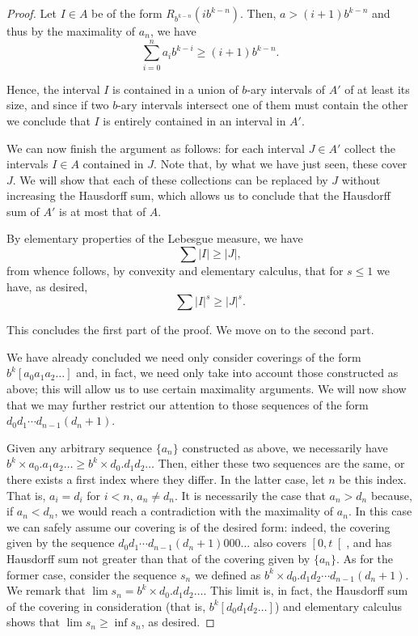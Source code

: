 \documentclass[11pt, reqno]{amsart}
\begin{document}
\begin{proof}
Let $I \in A$ be of the form $R_{b^{k-n}}(i b^{k-n})$. Then, $a > (i+1) b^{k-n}$ and thus by the maximality of $a_n$, we have
\[ \sum_{i = 0}^n a_i b^{k-i} \geq (i+1) b^{k-n}. \]

Hence, the interval $I$ is contained in a union of $b$-ary intervals of $A'$ of at least its size, and since if two $b$-ary intervals intersect one of them must contain the other we conclude that $I$ is entirely contained in an interval in $A'$.

We can now finish the argument as follows: for each interval $J \in A'$ collect the intervals $I \in A$ contained in $J$. Note that, by what we have just seen, these cover $J$. We will show that each of these collections can be replaced by $J$ without increasing the Hausdorff sum, which allows us to conclude that the Hausdorff sum of $A'$ is at most that of $A$.

By elementary properties of the Lebesgue measure, we have
\[ \sum \lvert I \rvert \geq \lvert J \rvert,\]
from whence follows, by convexity and elementary calculus, that for $s \leq 1$ we have, as desired,
\[ \sum \lvert I \rvert^s \geq \lvert J \rvert^s.\]

This concludes the first part of the proof. We move on to the second part.

We have already concluded we need only consider coverings of the form $b^k [a_0 a_1 a_2 \dots]$ and, in fact, we need only take into account those constructed as above; this will allow us to use certain maximality arguments. We will now show that we may further restrict our attention to those sequences of the form $d_0 d_1 \cdots d_{n-1} (d_n + 1)$.

Given any arbitrary sequence $\{a_n\}$ constructed as above, we necessarily have $b^k \times a_0 . a_1 a_2 \ldots \geq b^k \times d_0 . d_1 d_2 \dots$ Then, either these two sequences are the same, or there exists a first index  where they differ. In the latter case, let $n$ be this index. That is, $a_i = d_i$ for $i < n$, $a_n \neq d_n$. It is necessarily the case that $a_n > d_n$ because, if $a_n < d_n$, we would reach a contradiction with the maximality of $a_n$. In this case we can safely assume our covering is of the desired form: indeed, the covering given by the sequence $d_0 d_1 \cdots d_{n-1} (d_n + 1) 0 0 0 \dots$ also covers $\left[0, t \right[$, and has Hausdorff sum not greater than that of the covering given by $\{a_n\}$.
As for the former case, consider the sequence $s_n$ we defined as $b^k \times d_0 . d_1 d_2 \cdots d_{n-1} (d_n + 1)$. We remark that $\lim s_n = b^k \times d_0 . d_1 d_2 \dots$. This limit is, in fact, the Hausdorff sum of the covering in consideration (that is, $b^k [d_0 d_1 d_2 \dots]$) and elementary calculus shows that $\lim s_n \geq \inf s_n$, as desired.


\end{proof}
\end{document}
